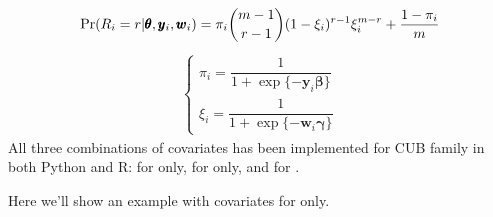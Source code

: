 \documentclass[letterpaper,10pt,english]{sphinxmanual}
\begin{document}
\sphinxAtStartPar
{}
\begin{equation*}
\begin{split}\Pr(R_i=r|\pmb\theta, \pmb y_i, \pmb w_i) = \pi_i \dbinom{m-1}{r-1}(1-\xi_i)^{r-1}\xi_i^{m-r}+\dfrac{1-\pi_i}{m}\end{split}
\end{equation*}\begin{equation*}
\begin{split}\left\{
\begin{array}{l}
    \pi_i = \dfrac{1}{1+\exp\{-\pmb y_i \pmb \beta\}}
    \\
    \xi_i = \dfrac{1}{1+\exp\{-\pmb w_i \pmb \gamma\}}
\end{array}
\right.\end{split}
\end{equation*}
\sphinxAtStartPar
All three combinations of covariates has been implemented for CUB family in both Python and R:
for  only, for  only, and for .

\sphinxAtStartPar
Here we’ll show an example with covariates for  only.
\end{document}
